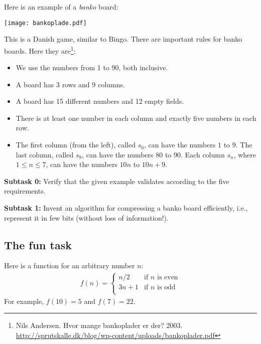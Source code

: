 Here is an example of a \emph{banko} board:

\begin{center}
\texttt{[image: bankoplade.pdf]}
\end{center}

This is a Danish game, similar to Bingo.  There are important rules for banko
boards.  Here they are\footnote{Nils Andersen.  Hvor
mange bankoplader er der?  2003.\\
\tiny{\url{http://sprutskalle.dk/blog/wp-content/uploads/bankoplader.pdf}}}:

\begin{itemize}
\item We use the numbers from 1 to 90, both inclusive.
\item A board has 3 rows and 9 columns.
\item A board has 15 different numbers and 12 empty fields.
\item There is at least one number in each column and exactly five numbers in
each row.
\item The first column (from the left), called $s_0$, can have the numbers $1$
to $9$.  The last column, called $s_8$, can have the numbers $80$ to $90$.  Each
column $s_n$, where $1 \leq n \leq 7$, can have the numbers $10n$ to $10n + 9$.
\end{itemize}

\textbf{Subtask 0:} Verify that the given example validates according to the
five requirements.

\textbf{Subtask 1:} Invent an algorithm for compressing a banko board
efficiently, i.e., represent it in few bits (without loss of information!).


\newpage

\subsection{The fun task}


Here is a function for an arbitrary number $n$:
\begin{align*}
f(n) = \begin{cases}
n/2 &\text{if }n\text{ is even}\\
3n + 1 &\text{if }n\text{ is odd}\\
\end{cases}
\end{align*}
For example, $f(10) = 5$ and $f(7) = 22$.

